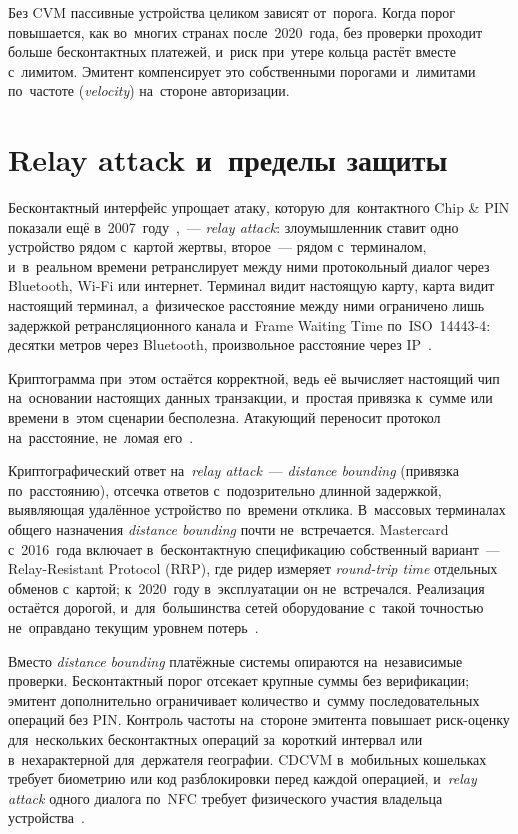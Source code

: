 Без CVM пассивные устройства целиком зависят от~порога. Когда порог повышается,
как во~многих странах после~2020~года, без проверки проходит больше
бесконтактных платежей, и~риск при~утере кольца растёт вместе с~лимитом.
Эмитент компенсирует это собственными порогами и~лимитами по~частоте
(\textit{velocity}) на~стороне авторизации.

\section{Relay attack и~пределы защиты}\label{sec:contactless-relay}

Бесконтактный интерфейс упрощает атаку, которую для~контактного Chip \& PIN
показали ещё в~2007~году~\cite{drimer-murdoch-relay-2007},~---
\textit{relay attack}: злоумышленник ставит одно
устройство рядом с~картой жертвы, второе~--- рядом с~терминалом, и~в~реальном
времени ретранслирует между ними протокольный диалог через Bluetooth, Wi-Fi или
интернет. Терминал видит настоящую карту, карта видит настоящий терминал,
а~физическое расстояние между ними ограничено лишь задержкой ретрансляционного
канала и~Frame Waiting Time по~ISO~14443-4: десятки метров через Bluetooth,
произвольное расстояние через
IP~\cite{francis-practical-relay-attack,korak-hutter-active-relay}.

Криптограмма при~этом остаётся корректной, ведь её вычисляет настоящий чип
на~основании настоящих данных транзакции, и~простая привязка к~сумме или
времени в~этом сценарии бесполезна. Атакующий переносит протокол
на~расстояние, не~ломая его~\cite{francis-practical-relay-attack}.

Криптографический ответ на~\textit{relay attack}~--- \textit{distance bounding}
(привязка по~расстоянию), отсечка ответов с~подозрительно длинной задержкой,
выявляющая удалённое устройство по~времени отклика. В~массовых терминалах
общего назначения \textit{distance bounding} почти не~встречается.
Mastercard с~2016~года включает в~бесконтактную спецификацию собственный
вариант~--- Relay-Resistant Protocol (RRP), где ридер измеряет
\textit{round-trip time} отдельных обменов с~картой; к~2020~году в~эксплуатации
он не~встречался. Реализация остаётся дорогой, и~для~большинства сетей
оборудование с~такой точностью не~оправдано текущим уровнем
потерь~\cite{kim-avoine-distance-bounding,chothia-rrp-ccs2020}.

Вместо \textit{distance bounding} платёжные системы опираются на~независимые
проверки. Бесконтактный порог отсекает крупные суммы без
верификации; эмитент дополнительно ограничивает количество и~сумму
последовательных операций без PIN. Контроль частоты на~стороне эмитента
повышает риск-оценку для~нескольких бесконтактных операций за~короткий
интервал или в~нехарактерной для~держателя географии. CDCVM в~мобильных
кошельках требует биометрию или код разблокировки перед каждой операцией,
и~\textit{relay attack} одного диалога по~NFC требует физического
участия владельца устройства~\cite{emvco-contactless-book-a,visa-tadg}.

